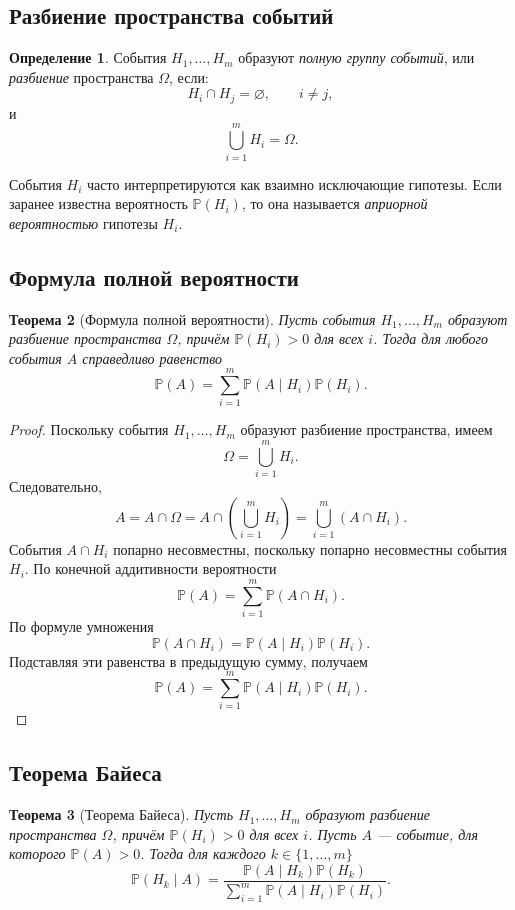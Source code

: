 \documentclass[12pt,a4paper]{article}
\theoremstyle{plain}
\newtheorem{theorem}{Теорема}[section]
\theoremstyle{definition}
\newtheorem{definition}[theorem]{Определение}
\theoremstyle{remark}
\newcommand{\Pp}{\mathbb{P}}
\begin{document}
\subsection{Разбиение пространства событий}

\begin{definition}
События $H_1,\ldots,H_m$ образуют \emph{полную группу событий}, или
\emph{разбиение} пространства $\Omega$, если:
\[
    H_i\cap H_j=\varnothing,\qquad i\ne j,
\]
и
\[
    \bigcup_{i=1}^{m}H_i=\Omega.
\]
\end{definition}

События $H_i$ часто интерпретируются как взаимно исключающие гипотезы.
Если заранее известна вероятность $\Pp(H_i)$, то она называется
\emph{априорной вероятностью} гипотезы $H_i$.

\subsection{Формула полной вероятности}

\begin{theorem}[Формула полной вероятности]
Пусть события $H_1,\ldots,H_m$ образуют разбиение пространства $\Omega$,
причём $\Pp(H_i)>0$ для всех $i$. Тогда для любого события $A$ справедливо
равенство
\[
    \Pp(A)
    =
    \sum_{i=1}^{m}
    \Pp(A\mid H_i)\Pp(H_i).
\]
\end{theorem}

\begin{proof}
Поскольку события $H_1,\ldots,H_m$ образуют разбиение пространства,
имеем
\[
    \Omega=\bigcup_{i=1}^{m}H_i.
\]
Следовательно,
\[
    A=A\cap\Omega
     =A\cap\left(\bigcup_{i=1}^{m}H_i\right)
     =\bigcup_{i=1}^{m}(A\cap H_i).
\]
События $A\cap H_i$ попарно несовместны, поскольку попарно несовместны
события $H_i$. По конечной аддитивности вероятности
\[
    \Pp(A)
    =
    \sum_{i=1}^{m}\Pp(A\cap H_i).
\]
По формуле умножения
\[
    \Pp(A\cap H_i)
    =
    \Pp(A\mid H_i)\Pp(H_i).
\]
Подставляя эти равенства в предыдущую сумму, получаем
\[
    \Pp(A)
    =
    \sum_{i=1}^{m}
    \Pp(A\mid H_i)\Pp(H_i).
\]
\end{proof}

\subsection{Теорема Байеса}

\begin{theorem}[Теорема Байеса]
Пусть $H_1,\ldots,H_m$ образуют разбиение пространства $\Omega$, причём
$\Pp(H_i)>0$ для всех $i$. Пусть $A$ --- событие, для которого
$\Pp(A)>0$. Тогда для каждого $k\in\{1,\ldots,m\}$
\[
    \boxed{
    \Pp(H_k\mid A)
    =
    \frac{\Pp(A\mid H_k)\Pp(H_k)}
    {\displaystyle
        \sum_{i=1}^{m}\Pp(A\mid H_i)\Pp(H_i)}
    }.
\]
\end{theorem}
\end{document}
